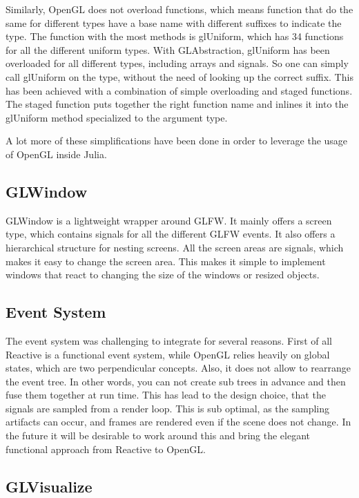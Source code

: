 Similarly, OpenGL does not overload functions, which means function that do the same for different types have a base name with different suffixes to indicate the type.
The function with the most methods is glUniform, which has 34 functions for all the different uniform types. With GLAbstraction, glUniform has been overloaded for all different types, including arrays and signals. So one can simply call glUniform on the type, without the need of looking up the correct suffix.
This has been achieved with a combination of simple overloading and staged functions. The staged function puts together the right function name and inlines it into the glUniform method specialized to the argument type.

A lot more of these simplifications have been done in order to leverage the usage of OpenGL inside Julia.

\subsection{GLWindow}
GLWindow is a lightweight wrapper around GLFW.
It mainly offers a screen type, which contains signals for all the different GLFW events. 
It also offers a hierarchical structure for nesting screens.
All the screen areas are signals, which makes it easy to change the screen area. 
This makes it simple to implement windows that react to changing the size of the windows or resized objects.

\subsection{Event System}

The event system was challenging to integrate for several reasons.
First of all Reactive is a functional event system, while \ac{OpenGL} relies heavily on global states, which are two perpendicular concepts.
Also, it does not allow to rearrange the event tree. 
In other words, you can not create sub trees in advance and then fuse them together at run time.
This has lead to the design choice, that the signals are sampled from a render loop.
This is sub optimal, as the sampling artifacts can occur, and frames are rendered even if the scene does not change.
In the future it will be desirable to work around this and bring the elegant functional approach from Reactive to OpenGL.


\subsection{GLVisualize}

